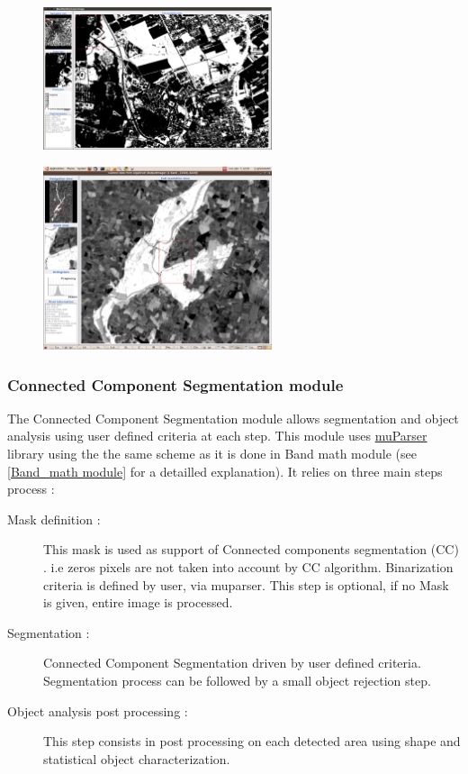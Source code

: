 \begin{figure}
  \center
  \includegraphics[width=0.6\textwidth]{../Art/MonteverdiImages/monteverdi_band_math_result.png}
  \label{fig:bandmathresult}
\end{figure}

\begin{figure}
  \center
  \includegraphics[width=0.6\textwidth]{../Art/MonteverdiImages/monteverdi_NDWI2_substraction.png}
  \label{fig:ndwi2}
\end{figure}


\subsubsection{Connected Component Segmentation module}

The Connected Component Segmentation module allows segmentation and object analysis using user defined criteria at each step. This module uses \href{http://muparser.sourceforge.net/}{muParser} library using the the same scheme as it is done in Band math module (see \ref{Band_math module} for a detailled explanation). It relies on three main steps process :

\begin{description}
\item[Mask definition :] This mask is used as support of Connected components segmentation (CC) . i.e zeros pixels are not taken into account by CC algorithm. Binarization criteria is defined by user, via muparser. This step is optional, if no Mask is given, entire image is processed.  
\item[Segmentation :] Connected Component Segmentation driven by user defined criteria. Segmentation process can be followed by a small object rejection step. 
\item[Object analysis post processing :] This step consists in post processing on each detected area using shape and statistical object characterization.
\end{description}

